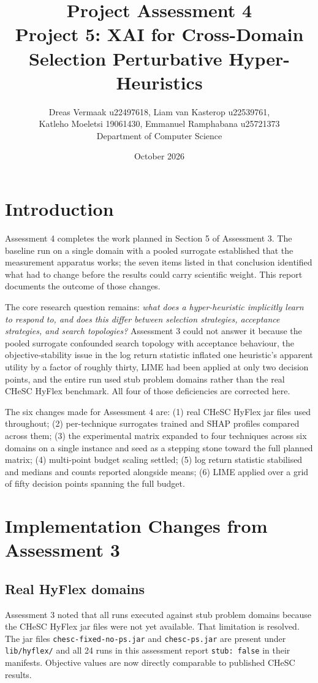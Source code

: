 \documentclass[11pt,a4paper]{article}
\title{\textbf{Project Assessment 4}\\
Project 5: XAI for Cross-Domain Selection Perturbative Hyper-Heuristics}
\author{Dreas Vermaak u22497618, Liam van Kasterop u22539761,\\
Katleho Moeletsi 19061430, Emmanuel Ramphabana u25721373\\
Department of Computer Science}
\date{October 2026}
\begin{document}
\maketitle

\section{Introduction}

Assessment 4 completes the work planned in Section 5 of Assessment 3. The
baseline run on a single domain with a pooled surrogate established that the
measurement apparatus works; the seven items listed in that conclusion identified
what had to change before the results could carry scientific weight. This report
documents the outcome of those changes.

The core research question remains: \emph{what does a hyper-heuristic implicitly
learn to respond to, and does this differ between selection strategies, acceptance
strategies, and search topologies?} Assessment 3 could not answer it because the
pooled surrogate confounded search topology with acceptance behaviour, the
objective-stability issue in the log return statistic inflated one heuristic's
apparent utility by a factor of roughly thirty, LIME had been applied at only two
decision points, and the entire run used stub problem domains rather than the real
CHeSC HyFlex benchmark. All four of those deficiencies are corrected here.

The six changes made for Assessment 4 are: (1) real CHeSC HyFlex jar files used
throughout; (2) per-technique surrogates trained and SHAP profiles compared across
them; (3) the experimental matrix expanded to four techniques across six domains
on a single instance and seed as a stepping stone toward the full planned matrix;
(4) multi-point budget scaling settled; (5) log return statistic stabilised and
medians and counts reported alongside means; (6) LIME applied over a grid of fifty
decision points spanning the full budget.

\section{Implementation Changes from Assessment 3}

\subsection{Real HyFlex domains}

Assessment 3 noted that all runs executed against stub problem domains because the
CHeSC HyFlex jar files were not yet available. That limitation is resolved. The jar
files \texttt{chesc-fixed-no-ps.jar} and \texttt{chesc-ps.jar} are present under
\texttt{lib/hyflex/} and all 24 runs in this assessment report \texttt{stub: false}
in their manifests. Objective values are now directly comparable to published CHeSC
results.
\end{document}
